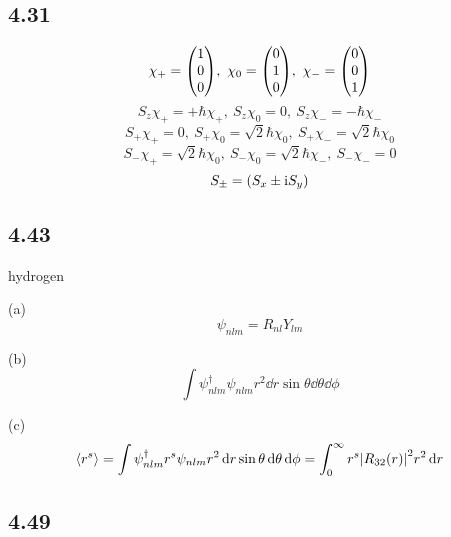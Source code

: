 \subsection{4.31}
\begin{framed}
    \[
        \chi_+ = \mqty(1 \\ 0 \\ 0),\ \chi_0 = \mqty(0 \\ 1 \\ 0),\ \chi_- = \mqty(0 \\ 0 \\ 1)
    \] \[
        S_z \chi_+ = + \hbar \chi_+,\ S_z \chi_0 = 0,\ S_z \chi_- = - \hbar \chi_-
    \] \[
        S_+ \chi_+ = 0,\ S_+ \chi_0 = \sqrt{2} \hbar \chi_0,\ S_+ \chi_- = \sqrt{2} \hbar \chi_0
    \] \[
        S_- \chi_+ = \sqrt{2} \hbar \chi_0,\ S_- \chi_0 = \sqrt{2} \hbar \chi_-,\ S_- \chi_- = 0
    \] \[
        S_{\pm} = \qty(S_x \pm \mathrm{i} S_y)
    \]
\end{framed}

\subsection{4.43}
\begin{framed}
    hydrogen

    (a)
    \[
        \psi_{nlm} = R_{nl} Y_{lm}
    \]

    (b)
    \[
        \int \psi_{nlm}^{\dagger} \psi_{nlm} r^2 \dd{r} \sin \theta \dd{\theta} \dd{\phi}
    \]

    (c)
    \[
        \expval{r^s} = \int \psi_{nlm}^{\dagger} r^s \psi_{nlm} r^2 \dd{r} \sin \theta \dd{\theta} \dd{\phi} = \int_0^{\infty} r^s \qty|R_{3 2}(r)|^2 r^2 \dd{r}
    \]
\end{framed}

\subsection{4.49}
\begin{framed}

\end{framed}

